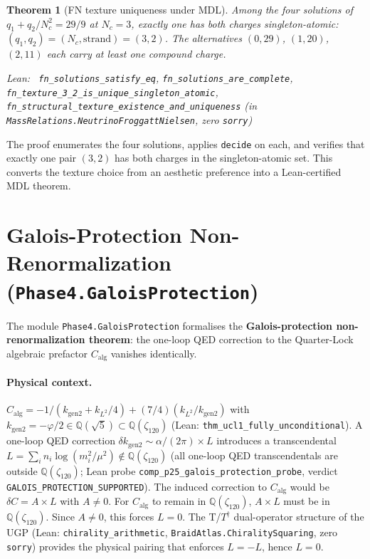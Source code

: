 \documentclass[11pt,a4paper]{article}
\newenvironment{leanref}%
  {\par\smallskip\noindent\begingroup\raggedright\textup{Lean:}~}%
  {\par\endgroup}
\newtheorem{theorem}{Theorem}[section]
\theoremstyle{definition}
\begin{document}
\begin{theorem}[FN texture uniqueness under MDL]
Among the four solutions of $q_1 + q_2/N_c^2 = 29/9$ at $N_c = 3$, exactly
one has both charges singleton-atomic: $(q_1, q_2) = (N_c, \mathrm{strand}) = (3, 2)$.
The alternatives $(0, 29)$, $(1, 20)$, $(2, 11)$ each carry at least one
compound charge.
\begin{leanref}
\lstinline|fn_solutions_satisfy_eq|,
\lstinline|fn_solutions_are_complete|,
\lstinline|fn_texture_3_2_is_unique_singleton_atomic|,
\lstinline|fn_structural_texture_existence_and_uniqueness|
\textup{(in \texttt{MassRelations.NeutrinoFroggattNielsen}, zero \texttt{sorry})}
\end{leanref}
\end{theorem}

The proof enumerates the four solutions, applies \texttt{decide} on each,
and verifies that exactly one pair $(3, 2)$ has both charges in the
singleton-atomic set.  This converts the texture choice from an aesthetic
preference into a Lean-certified MDL theorem.

\section{Galois-Protection Non-Renormalization (\texttt{Phase4.GaloisProtection})}
\label{sec:galois_protection}

The module \texttt{Phase4.GaloisProtection} formalises the
\textbf{Galois-protection non-renormalization theorem}: the one-loop QED correction
to the Quarter-Lock algebraic prefactor $C_\mathrm{alg}$ vanishes identically.

\paragraph{Physical context.}
$C_\mathrm{alg} = -1/(k_{\mathrm{gen2}} + k_{L^2}/4) + (7/4)(k_{L^2}/k_{\mathrm{gen2}})$
with $k_{\mathrm{gen2}} = -\varphi/2 \in \mathbb{Q}(\sqrt5) \subset \mathbb{Q}(\zeta_{120})$
(Lean: \texttt{thm\_ucl1\_fully\_unconditional}).  A one-loop QED correction
$\delta k_{\mathrm{gen2}} \sim \alpha/(2\pi) \times L$ introduces a transcendental
$L = \sum_i n_i \log(m_i^2/\mu^2) \notin \mathbb{Q}(\zeta_{120})$ (all one-loop
QED transcendentals are outside $\mathbb{Q}(\zeta_{120})$; Lean probe
\texttt{comp\_p25\_galois\_protection\_probe}, verdict
\texttt{GALOIS\_PROTECTION\_SUPPORTED}).  The induced correction to $C_\mathrm{alg}$
would be $\delta C = A \times L$ with $A \neq 0$.  For $C_\mathrm{alg}$ to remain
in $\mathbb{Q}(\zeta_{120})$, $A \times L$ must be in $\mathbb{Q}(\zeta_{120})$.
Since $A \neq 0$, this forces $L = 0$.  The T/$T^\dagger$ dual-operator structure
of the UGP (Lean: \texttt{chirality\_arithmetic},
\texttt{BraidAtlas.ChiralitySquaring}, zero \texttt{sorry}) provides the
physical pairing that enforces $L = -L$, hence $L = 0$.
\end{document}
